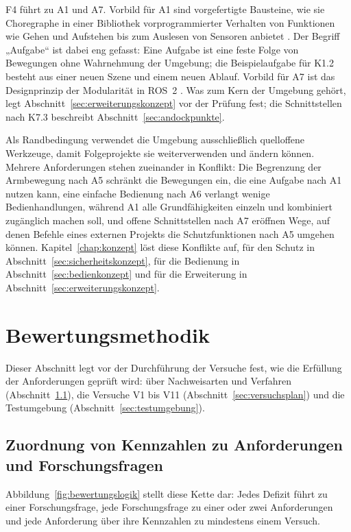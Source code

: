 F4 führt zu A1 und A7.
Vorbild für A1 sind vorgefertigte Bausteine, wie sie Choregraphe in einer Bibliothek vorprogrammierter Verhalten von Funktionen wie Gehen und Aufstehen bis zum Auslesen von Sensoren anbietet \cite{Pot2009}.
Der Begriff „Aufgabe“ ist dabei eng gefasst: Eine Aufgabe ist eine feste Folge von Bewegungen ohne Wahrnehmung der Umgebung; die Beispielaufgabe für K1.2 besteht aus einer neuen Szene und einem neuen Ablauf.
Vorbild für A7 ist das Designprinzip der Modularität in ROS~2 \cite{Macenski2022}.
Was zum Kern der Umgebung gehört, legt Abschnitt~\ref{sec:erweiterungskonzept} vor der Prüfung fest; die Schnittstellen nach K7.3 beschreibt Abschnitt~\ref{sec:andockpunkte}.

Als Randbedingung verwendet die Umgebung ausschließlich quelloffene Werkzeuge, damit Folgeprojekte sie weiterverwenden und ändern können.
Mehrere Anforderungen stehen zueinander in Konflikt: Die Begrenzung der Armbewegung nach A5 schränkt die Bewegungen ein, die eine Aufgabe nach A1 nutzen kann, eine einfache Bedienung nach A6 verlangt wenige Bedienhandlungen, während A1 alle Grundfähigkeiten einzeln und kombiniert zugänglich machen soll, und offene Schnittstellen nach A7 eröffnen Wege, auf denen Befehle eines externen Projekts die Schutzfunktionen nach A5 umgehen können.
Kapitel~\ref{chap:konzept} löst diese Konflikte auf, für den Schutz in Abschnitt~\ref{sec:sicherheitskonzept}, für die Bedienung in Abschnitt~\ref{sec:bedienkonzept} und für die Erweiterung in Abschnitt~\ref{sec:erweiterungskonzept}.

\section{Bewertungsmethodik}
\label{sec:bewertungsmethodik}
Dieser Abschnitt legt vor der Durchführung der Versuche fest, wie die Erfüllung der Anforderungen geprüft wird: über Nachweisarten und Verfahren (Abschnitt~\ref{sec:kennzahlen}), die Versuche V1 bis V11 (Abschnitt~\ref{sec:versuchsplan}) und die Testumgebung (Abschnitt~\ref{sec:testumgebung}).

\subsection{Zuordnung von Kennzahlen zu Anforderungen und Forschungsfragen}
\label{sec:kennzahlen}
Abbildung~\ref{fig:bewertungslogik} stellt diese Kette dar: Jedes Defizit führt zu einer Forschungsfrage, jede Forschungsfrage zu einer oder zwei Anforderungen und jede Anforderung über ihre Kennzahlen zu mindestens einem Versuch.

